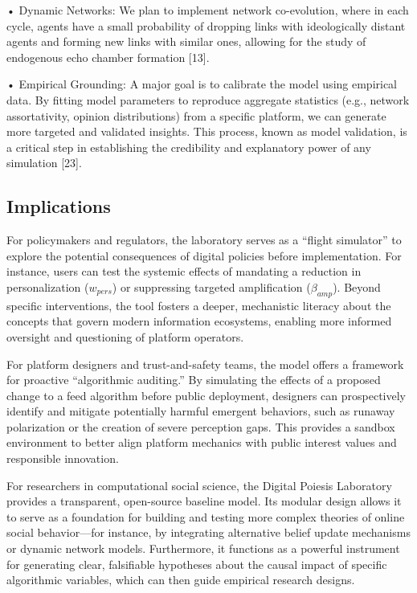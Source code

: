 \documentclass[11pt]{article}
\begin{document}
• Dynamic Networks: We plan to implement network co-evolution, where in each cycle, agents have a small probability of dropping links with ideologically distant agents and forming new links with similar ones, allowing for the study of endogenous echo chamber formation [13].

• Empirical Grounding: A major goal is to calibrate the model using empirical data. By fitting model parameters to reproduce aggregate statistics (e.g., network assortativity, opinion distributions) from a specific platform, we can generate more targeted and validated insights. This process, known as model validation, is a critical step in establishing the credibility and explanatory power of any simulation [23].

\subsection{Implications}

For policymakers and regulators, the laboratory serves as a ``flight simulator'' to explore the potential consequences of digital policies before implementation. For instance, users can test the systemic effects of mandating a reduction in personalization ($w_{pers}$) or suppressing targeted amplification ($\beta_{amp}$). Beyond specific interventions, the tool fosters a deeper, mechanistic literacy about the concepts that govern modern information ecosystems, enabling more informed oversight and questioning of platform operators.

For platform designers and trust-and-safety teams, the model offers a framework for proactive ``algorithmic auditing.'' By simulating the effects of a proposed change to a feed algorithm before public deployment, designers can prospectively identify and mitigate potentially harmful emergent behaviors, such as runaway polarization or the creation of severe perception gaps. This provides a sandbox environment to better align platform mechanics with public interest values and responsible innovation.

For researchers in computational social science, the Digital Poiesis Laboratory provides a transparent, open-source baseline model. Its modular design allows it to serve as a foundation for building and testing more complex theories of online social behavior—for instance, by integrating alternative belief update mechanisms or dynamic network models. Furthermore, it functions as a powerful instrument for generating clear, falsifiable hypotheses about the causal impact of specific algorithmic variables, which can then guide empirical research designs.
\end{document}
